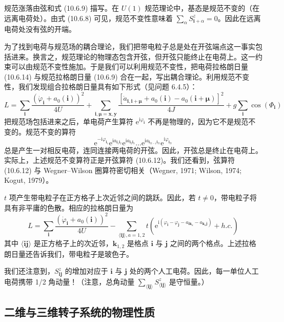 规范涨落由弦和式 (10.6.9) 描写。在 $U(1)$ 规范理论中，基态是规范不变的（在远离电荷处）。由式 (10.6.8) 可见，规范不变性意味着 $\sum_{\alpha}S^{z}_{\pmb i+\alpha}=0$。因此在远离电荷处没有弦的开端。

为了找到电荷与规范场的耦合理论，我们把带电粒子总是处在开弦端点这一事实包括进来。换言之，规范理论的物理态包含开弦，但开弦只能终止在电荷上。这一约束可以由规范不变性施加。于是我们可以利用规范不变性，把电荷拉格朗日量 (10.6.14) 与规范拉格朗日量 (10.6.9) 合在一起，写出耦合理论。利用规范不变性，我们发现组合拉格朗日量具有如下形式（见问题 6.4.5）：
\begin{equation*}
L=\sum_{\pmb i}\frac{(\dot{\varphi}_{\pmb i}+a_0(\pmb i))^{2}}{4U}+\sum_{\pmb i,\pmb\mu=\pmb x,\pmb y}\frac{[\dot{a}_{\pmb i,\pmb i+\pmb\mu}+a_0(\pmb i)-a_0(\pmb i+\pmb\mu)]^{2}}{4J}+g\sum_{\pmb i}\cos(\Phi_{\pmb i})
\end{equation*}
把规范场包括进来之后，单电荷产生算符 $\mathrm{e}^{\mathrm{i}\varphi_{\pmb i}}$ 不再是物理的，因为它不是规范不变的。规范不变的算符
\begin{equation*}
\mathrm{e}^{-\mathrm{i}\varphi_{\pmb i_1}}\mathrm{e}^{\mathrm{i}a_{\pmb i_1\pmb i_2}}\mathrm{e}^{\mathrm{i}a_{\pmb i_2\pmb i_3}}\dots\mathrm{e}^{\mathrm{i}a_{\pmb i_{N-1}\pmb i_N}}\mathrm{e}^{\mathrm{i}\varphi_{\pmb i_N}}
\end{equation*}
总是产生一对相反电荷，连同连接两电荷的开弦。因此，开弦总是终止在电荷上。实际上，上述规范不变算符正是开弦算符 (10.6.12)。我们还看到，弦算符 (10.6.12) 与 Wegner--Wilson 圈算符密切相关（Wegner, 1971; Wilson, 1974; Kogut, 1979）。

$t$ 项产生带电粒子在正方格子上次近邻之间的跳跃。因此，若 $t\neq0$，带电粒子将具有非平庸的色散。相应的拉格朗日量为
\begin{equation*}
L=\sum_{\pmb i}\frac{(\dot{\varphi}_{\pmb i}+a_0(\pmb i))^{2}}{4U}-\sum_{\langle\pmb i\pmb j\rangle,a=1,2}t(\mathrm{e}^{\mathrm{i}(\varphi_{\pmb i}-\varphi_{\pmb j}-a_{\pmb i\pmb k_a}-a_{\pmb k_a\pmb j})}+h.c.)\tag{10.6.15}
\end{equation*}
其中 $\langle\pmb i\pmb j\rangle$ 是正方格子上的次近邻，$\pmb k_{1,2}$ 是格点 $\pmb i$ 与 $\pmb j$ 之间的两个格点。上述拉格朗日量还告诉我们，带电粒子是玻色子。

我们还注意到，$S^{z}_{\pmb i\pmb j}$ 的增加对应于 $\pmb i$ 与 $\pmb j$ 处的两个人工电荷。因此，每一单位人工电荷携带 1/2 角动量！（注意，总角动量 $\sum_{\langle\pmb i\pmb j\rangle}S^{z}_{\langle\pmb i\pmb j\rangle}$ 是守恒量。）

\subsection{二维与三维转子系统的物理性质}

